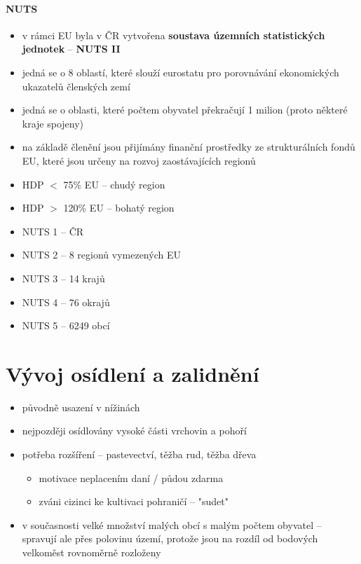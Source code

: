 \paragraph{NUTS}
\begin{itemize}
\item v rámci EU byla v ČR vytvořena \textbf{soustava územních statistických jednotek} -- \textbf{NUTS II}
\item jedná se o 8 oblastí, které slouží eurostatu pro porovnávání ekonomických ukazatelů členských zemí
\item jedná se o oblasti, které počtem obyvatel překračují 1 milion (proto některé kraje spojeny)
\item na základě členění jsou přijímány finanční prostředky ze strukturálních fondů EU, které jsou určeny na rozvoj zaostávajících regionů 
\item HDP $<$ 75\% EU -- chudý region
\item HDP $>$ 120\% EU -- bohatý region
\item NUTS 1 -- ČR
\item NUTS 2 -- 8 regionů vymezených EU
\item NUTS 3 -- 14 krajů
\item NUTS 4 -- 76 okrajů
\item NUTS 5 -- 6249 obcí
\end{itemize}

\section{Vývoj osídlení a zalidnění}
\begin{itemize}
\item původně usazení v nížinách 
\item nejpozději osídlovány vysoké části vrchovin a pohoří
\item potřeba rozšíření -- pastevectví, těžba rud, těžba dřeva
	\begin{itemize}
	\item motivace neplacením daní / půdou zdarma
	\item zváni cizinci ke kultivaci pohraničí -- "sudet"
	\end{itemize}
\item v současnosti velké množství malých obcí s malým počtem obyvatel -- spravují ale přes polovinu území, protože jsou na rozdíl od bodových velkoměst rovnoměrně rozloženy
\end{itemize}

